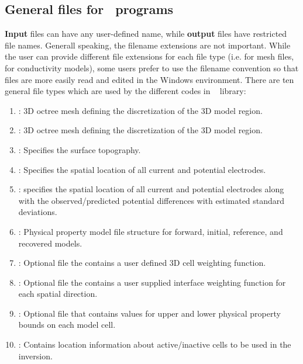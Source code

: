 \subsection{General files for \prog ~programs}

\textbf{Input} files can have any user-defined name, while \textbf{output} files have restricted file names. Generall speaking, the filename extensions are not important. While the user can provide different file extensions for each file type (i.e.  for mesh files,  for conductivity models), some users prefer to use the  filename convention so that files are more easily read and edited in the Windows environment. There are ten general file types which are used by the different codes in \programName~ library:

\begin{enumerate}
\item {}: 3D octree mesh defining the discretization of the 3D model region.
\item {}: 3D octree mesh defining the discretization of the 3D model region.
\item {}: Specifies the surface topography.
\item {}: Specifies the spatial location of all current and potential electrodes.
\item {}: specifies the spatial location of all current and potential electrodes along with the observed/predicted potential differences with estimated standard deviations.
\item {}: Physical property model file structure for forward, initial, reference, and recovered models.
\item {}: Optional file the contains a user defined 3D cell weighting function.
\item {}: Optional file the contains a user supplied interface weighting function for each spatial direction.
\item {}: Optional file that contains values for upper and lower physical property bounds on each model cell.
\item {}: Contains location information about active/inactive cells to be used in the inversion.
\end{enumerate}



